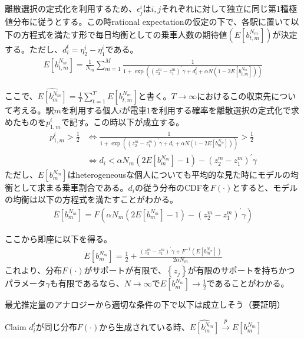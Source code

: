 \documentclass{jsarticle}
\begin{document}
離散選択の定式化を利用するため、$\epsilon_j^i$は$i, j$それぞれに対して独立に同じ第1種極値分布に従うとする。この時rational expectationの仮定の下で、各駅に置いて以下の方程式を満たす形で毎日均衡としての乗車人数の期待値$(E[b_{t,m}^{N_m}])$が決定する。ただし、$d_i^t = \eta_2^i - \eta_1^i$である。
\begin{align*}
	E[b_{t,m}^{N_m}] = \frac{1}{N_m} \sum_{m = 1}^M \frac{1}{1 + \exp\left( (z_2^m - z_1^m)^{'}\gamma + d_i^t + \alpha N \left(1 - 2E[b_{t,m}^{N_m}]\right) \right)}
\end{align*}

ここで、$\widehat{E[b_m^{N_m}]} = \frac{1}{T} \sum_{t = 1}^T E[b_{t,m}^{N_m}]$と書く。$T \to \infty$におけるこの収束先について考える。駅$m$を利用する個人$i$が電車$1$を利用する確率を離散選択の定式化で求めたものを$p_{1,m}^i$で記す。この時以下が成立する。
\begin{align*}
	p_{1,m}^i > \frac{1}{2} &\Leftrightarrow \frac{1}{1 + \exp\left( (z_2^m - z_1^m)^{'}\gamma + d_i + \alpha N \left(1 - 2E[b_m^{N_m}]\right) \right)} > \frac{1}{2}\\[8pt]
	&\Leftrightarrow d_i < \alpha N_m \left(2E[b_m^{N_m}] - 1\right) - (z_2^m - z_1^m)^{'}\gamma
\end{align*}
ただし、$E[b_m^{N_m}]$はheterogeneousな個人についても平均的な見た時にモデルの均衡として求まる乗車割合である。$d_i$の従う分布のCDFを$F(\cdot)$とすると、モデルの均衡は以下の方程式を満たすことがわかる。
\begin{align*}
	E[b_m^{N_m}] = F\left( \alpha N_m \left(2E[b_m^{N_m}] - 1\right) - (z_2^m - z_1^m)^{'}\gamma \right)
\end{align*}

ここから即座に以下を得る。
\begin{align*}
	E[b_m^{N_m}] = \frac{1}{2} + \frac{(z_2^m - z_1^m)^{'}\gamma + F^{-1} \left( E[b_m^{N_m}] \right)}{2\alpha N_m}
\end{align*}
これより、分布$F(\cdot)$がサポートが有限で、$\left\{ z_j \right\}$が有限のサポートを持ちかつパラメータ$\gamma$も有限であるなら、$N \to \infty$で$E[b_m^{N_m}] \to \frac{1}{2}$であることがわかる。

最尤推定量のアナロジーから適切な条件の下で以下は成立しそう（要証明）
\begin{itembox}[l]{Claim}
	$d_i^t$が同じ分布$F(\cdot)$から生成されている時、$\widehat{E[b_m^{N_m}]} \xrightarrow[]{p} E[b_m^{N_m}]$
\end{itembox}
\end{document}
